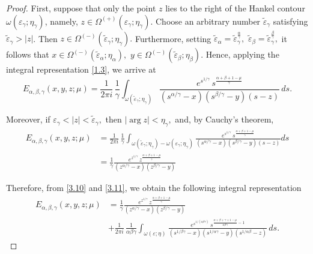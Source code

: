 \documentclass[12pt, reqno]{amsart}
\theoremstyle{definition}
\theoremstyle{remark}
\numberwithin{equation}{section}
\begin{document}
\begin{proof}
   First, suppose that only the point $z$ lies to the right of the Hankel contour
$\omega(\varepsilon_\gamma;\eta_\gamma)$, namely,
$
z\in\Omega^{(+)}(\varepsilon_\gamma;\eta_\gamma).
$
Choose an arbitrary number $\widetilde{\varepsilon}_{\gamma}$ satisfying
$\widetilde{\varepsilon}_{\gamma}>|z|$. Then
$
z\in\Omega^{(-)}(\widetilde{\varepsilon}_{\gamma};\eta_\gamma).
$
Furthermore, setting
$
\widetilde{\varepsilon}_{\alpha}
=\widetilde{\varepsilon}_{\gamma}^{\frac{\alpha}{\gamma}},
\,\,
\widetilde{\varepsilon}_{\beta}
=\widetilde{\varepsilon}_{\gamma}^{\frac{\beta}{\gamma}},
$
it follows that
$
x\in\Omega^{(-)}(\widetilde{\varepsilon}_{\alpha};\eta_\alpha),
\,\,
y\in\Omega^{(-)}(\widetilde{\varepsilon}_{\beta};\eta_\beta).
$
Hence, applying the integral representation \eqref{1.3}, we arrive at
\begin{equation}\label{3.10}E_{\alpha,\beta,\gamma}(x,y,z;\mu)
=
\frac{1}{2\pi i}\,
\frac{1}{\gamma}
\int_{\omega(\widetilde{\varepsilon}_{\gamma};\eta_\gamma)}
\frac{
e^{s^{1/\gamma}}
\,s^{\frac{\alpha+\beta+1-\mu}{\gamma}}
}
{
(s^{\alpha/\gamma}-x)(s^{\beta/\gamma}-y)(s-z)
}
\,ds.\end{equation}

Moreover, if
$
\varepsilon_\gamma<|z|<\widetilde{\varepsilon}_{\gamma},
$
then
$
|\arg z|<\eta_\gamma,
$
and, by Cauchy's theorem,
\begin{equation}\label{3.11}\begin{aligned}
E_{\alpha,\beta,\gamma}(x,y,z;\mu)
&=
\frac{1}{2\pi i}\,
\frac{1}{\gamma}
\int_{\omega(\widetilde{\varepsilon}_{\gamma};\eta_\gamma)
-
\omega(\varepsilon_\gamma;\eta_\gamma)}
\frac{
e^{s^{1/\gamma}}
\,s^{\frac{\alpha+\beta+1-\mu}{\gamma}}
}
{
(s^{\alpha/\gamma}-x)(s^{\beta/\gamma}-y)(s-z)
}ds\\
&=\frac{1}{\gamma}
\frac{
e^{z^{1/\gamma}}
\,z^{\frac{\alpha+\beta+1-\mu}{\gamma}}}
{(z^{\alpha/\gamma}-x)(z^{\beta/\gamma}-y)}\end{aligned}
\end{equation}

Therefore, from \eqref{3.10} and \eqref{3.11}, we obtain the following integral representation 
\begin{equation}\label{3.12}\begin{aligned}
E_{\alpha,\beta,\gamma}(x,y,z;\mu)
&=\frac{1}{\gamma}\frac{
e^{z^{1/\gamma}}
\,z^{\frac{\alpha+\beta+1-\mu}{\gamma}}}
{(z^{\alpha/\gamma}-x)(z^{\beta/\gamma}-y)}\\
&+
\frac{1}{2\pi i}\,
\frac{1}{\alpha\beta\gamma}
\int_{\omega(\varepsilon;\eta)}
\frac{
e^{s^{1/(\alpha\beta\gamma)}}
\,s^{\frac{\alpha+\beta+\gamma+1-\mu}{\alpha\beta\gamma}-1}
}
{
(s^{1/\beta\gamma}-x)(s^{1/\alpha\gamma}-y)(s^{1/\alpha\beta}-z)
}
\,ds.\end{aligned}\end{equation}


\end{proof}
\end{document}

